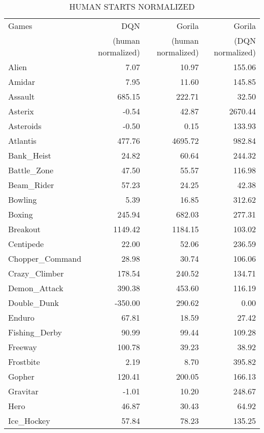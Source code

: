 \documentclass{article}
\begin{document}
\begin{table*}[h]
	\vskip 0.5in
	\caption{HUMAN STARTS NORMALIZED}
	\centering 
	\begin{tabular}{l|r|r|r}
		\hline \hline
		Games & DQN & Gorila & Gorila \\
		& (human normalized)&(human normalized)& (DQN normalized) \\
		\hline
		Alien & 7.07 & 10.97 & 155.06 \\
		\hline
		Amidar & 7.95 & 11.60 & 145.85 \\
		\hline
		Assault & 685.15 & 222.71 & 32.50 \\
		\hline
		Asterix & -0.54 & 42.87 & 2670.44 \\
		\hline
		Asteroids & -0.50 & 0.15 & 133.93 \\
		\hline
		Atlantis & 477.76 & 4695.72 & 982.84 \\
		\hline
		Bank\_Heist & 24.82 & 60.64 & 244.32 \\
		\hline
		Battle\_Zone & 47.50 & 55.57 & 116.98 \\
		\hline
		Beam\_Rider & 57.23 & 24.25 & 42.38 \\
		\hline
		Bowling & 5.39 & 16.85 & 312.62 \\
		\hline
		Boxing & 245.94 & 682.03 & 277.31 \\
		\hline
		Breakout & 1149.42 & 1184.15 & 103.02 \\
		\hline
		Centipede & 22.00 & 52.06 & 236.59 \\
		\hline
		Chopper\_Command & 28.98 & 30.74 & 106.06 \\
		\hline
		Crazy\_Climber & 178.54 & 240.52 & 134.71 \\
		\hline
		Demon\_Attack & 390.38 & 453.60 & 116.19 \\
		\hline
		Double\_Dunk & -350.00 & 290.62 & 0.00 \\
		\hline
		Enduro & 67.81 & 18.59 & 27.42 \\
		\hline
		Fishing\_Derby & 90.99 & 99.44 & 109.28 \\
		\hline
		Freeway & 100.78 & 39.23 & 38.92 \\
		\hline
		Frostbite & 2.19 & 8.70 & 395.82 \\
		\hline
		Gopher & 120.41 & 200.05 & 166.13 \\
		\hline
		Gravitar & -1.01 & 10.20 & 248.67 \\
		\hline
		Hero & 46.87 & 30.43 & 64.92 \\
		\hline
		Ice\_Hockey & 57.84 & 78.23 & 135.25 \\

\end{tabular}
\end{table*}
\end{document}
